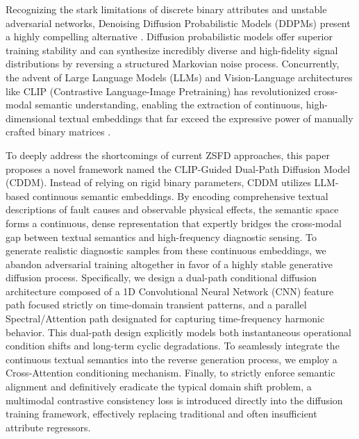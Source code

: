 Recognizing the stark limitations of discrete binary attributes and unstable adversarial networks, Denoising Diffusion Probabilistic Models (DDPMs) \cite{ho2020denoising,dhariwal2021diffusion} present a highly compelling alternative \cite{feng2021fault}. Diffusion probabilistic models offer superior training stability and can synthesize incredibly diverse and high-fidelity signal distributions by reversing a structured Markovian noise process. Concurrently, the advent of Large Language Models (LLMs) and Vision-Language architectures like CLIP (Contrastive Language-Image Pretraining) \cite{radford2021learning} has revolutionized cross-modal semantic understanding, enabling the extraction of continuous, high-dimensional textual embeddings that far exceed the expressive power of manually crafted binary matrices \cite{wang2020deep}.

To deeply address the shortcomings of current ZSFD approaches, this paper proposes a novel framework named the CLIP-Guided Dual-Path Diffusion Model (CDDM). Instead of relying on rigid binary parameters, CDDM utilizes LLM-based continuous semantic embeddings. By encoding comprehensive textual descriptions of fault causes and observable physical effects, the semantic space forms a continuous, dense representation that expertly bridges the cross-modal gap between textual semantics and high-frequency diagnostic sensing. To generate realistic diagnostic samples from these continuous embeddings, we abandon adversarial training altogether in favor of a highly stable generative diffusion process. Specifically, we design a dual-path conditional diffusion architecture composed of a 1D Convolutional Neural Network (CNN) feature path focused strictly on time-domain transient patterns, and a parallel Spectral/Attention path designated for capturing time-frequency harmonic behavior. This dual-path design explicitly models both instantaneous operational condition shifts and long-term cyclic degradations. To seamlessly integrate the continuous textual semantics into the reverse generation process, we employ a Cross-Attention conditioning mechanism. Finally, to strictly enforce semantic alignment and definitively eradicate the typical domain shift problem, a multimodal contrastive consistency loss is introduced directly into the diffusion training framework, effectively replacing traditional and often insufficient attribute regressors.

